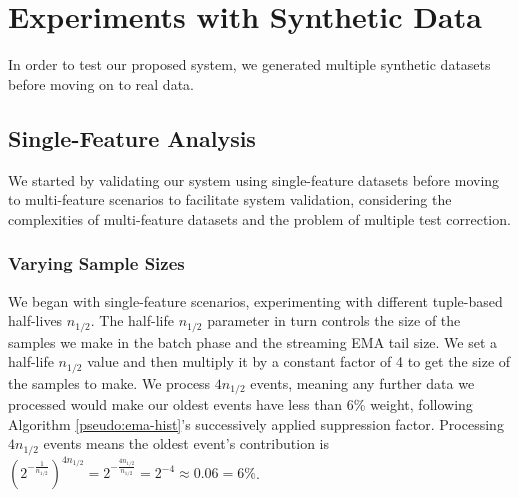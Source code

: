 \documentclass[sigconf]{acmart}
\begin{document}
\section{Experiments with Synthetic Data}
\label{sec:SyntheticExperiments}
In order to test our proposed system, we generated multiple synthetic datasets before moving on to real data.

\subsection{Single-Feature Analysis}
We started by validating our system using single-feature datasets before moving to multi-feature scenarios to facilitate system validation, considering the complexities of multi-feature datasets and the problem of multiple test correction.

\subsubsection{Varying Sample Sizes}
We began with single-feature scenarios, experimenting with different tuple-based half-lives $n_{1/2}$. The half-life $n_{1/2}$ parameter in turn controls the size of the samples we make in the batch phase and the streaming EMA tail size. We set a half-life $n_{1/2}$ value and then multiply it by a constant factor of 4 to get the size of the samples to make. We process $4n_{1/2}$ events, meaning any further data we processed would make our oldest events have less than 6\% weight, following Algorithm \ref{pseudo:ema-hist}'s successively applied suppression factor. Processing $4n_{1/2}$ events means the oldest event's contribution is $({2^{- \frac{1}{n_{1/2}}}})^{4n_{1/2}} = {2^{- \frac{4n_{1/2}}{n_{1/2}}}} = 2^{-4} \approx 0.06 = 6\%$. 
\end{document}
